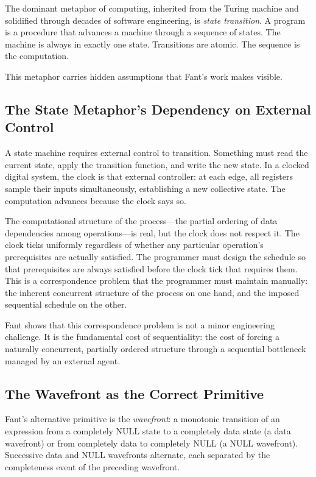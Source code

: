 \documentclass[12pt, a4paper]{article}
\begin{document}
The dominant metaphor of computing, inherited from the Turing machine
and solidified through decades of software engineering, is
\emph{state transition}. A program is a procedure that advances a
machine through a sequence of states. The machine is always in exactly
one state. Transitions are atomic. The sequence is the computation.

This metaphor carries hidden assumptions that Fant's work makes visible.

\subsection{The State Metaphor's Dependency on External Control}

A state machine requires external control to transition. Something
must read the current state, apply the transition function, and write
the new state. In a clocked digital system, the clock is that external
controller: at each edge, all registers sample their inputs
simultaneously, establishing a new collective state. The computation
advances because the clock says so.

The computational structure of the process---the partial ordering of
data dependencies among operations---is real, but the clock does not
respect it. The clock ticks uniformly regardless of whether any
particular operation's prerequisites are actually satisfied. The
programmer must design the schedule so that prerequisites are always
satisfied before the clock tick that requires them. This is a
correspondence problem that the programmer must maintain manually:
the inherent concurrent structure of the process on one hand, and the
imposed sequential schedule on the other.

Fant shows that this correspondence problem is not a minor engineering
challenge. It is the fundamental cost of sequentiality: the cost of
forcing a naturally concurrent, partially ordered structure through
a sequential bottleneck managed by an external agent.

\subsection{The Wavefront as the Correct Primitive}

Fant's alternative primitive is the \emph{wavefront}: a monotonic
transition of an expression from a completely NULL state to a
completely data state (a data wavefront) or from completely data to
completely NULL (a NULL wavefront). Successive data and NULL wavefronts
alternate, each separated by the completeness event of the preceding
wavefront.
\end{document}
